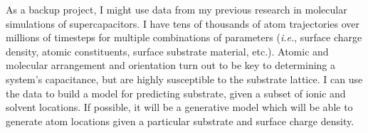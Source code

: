 \documentclass[12pt]{article}
\begin{document}
As a backup project, I might use data from my previous research in molecular simulations of supercapacitors. I have tens of thousands of atom trajectories over millions of timesteps for multiple combinations of parameters (\textit{i.e.}, surface charge density, atomic constituents, surface substrate material, etc.). Atomic and molecular arrangement and orientation turn out to be key to determining a system's capacitance, but are highly susceptible to the substrate lattice. I can use the data to build a model for predicting substrate, given a subset of ionic and solvent locations. If possible, it will be a generative model which will be able to generate atom locations given a particular substrate and surface charge density.
\end{document}
